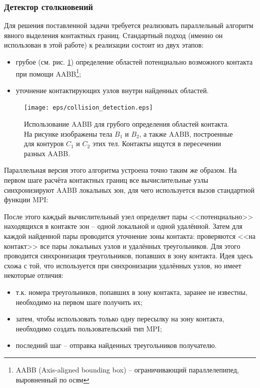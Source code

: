 \subsubsection{Детектор столкновений}
Для решения поставленной задачи требуется реализовать параллельный алгоритм явного выделения контактных границ. Стандартный подход (именно он использован в этой работе) к реализации состоит из двух этапов:
\begin{itemize}
	\item грубое (см. рис. \ref{pic:collision_detection}) определение областей потенциально возможного контакта при помощи AABB\footnote{AABB (Axis-aligned bounding box) -- ограничивающий параллелепипед, выровненный по осям };
	\item уточнение контактирующих узлов внутри найденных областей.
\end{itemize}
\begin{figure}[htp]
\centering
\texttt{[image: eps/collision\_detection.eps]}
\caption{Использование AABB для грубого определения областей контакта. На
рисунке изображены тела $B_1$ и $B_2$, а также AABB, построенные для контуров
$C_1$ и $C_2$ этих тел. Контакты ищутся в пересечении разных AABB.}
\label{pic:collision_detection}
\end{figure}
Параллельная версия этого алгоритма устроена точно таким же образом. На первом шаге расчёта контактных границ все вычислительные узлы синхронизируют AABB локальных зон, для чего используется вызов стандартной функции MPI:

После этого каждый вычислительный узел определяет пары <<потенциально>> находящихся в контакте зон -- одной локальной и одной удалённой. Затем для каждой найденной пары проводится уточнение зоны контакта: проверяются <<на контакт>> все пары локальных узлов и удалённых треугольников. Для этого проводится синхронизация треугольников, попавших в зону контакта. Идея здесь схожа с той, что используется при синхронизации удалённых узлов, но имеет некоторые отличия:
\begin{itemize}
	\item т.к. номера треугольников, попавших в зону контакта, заранее не известны, необходимо на первом шаге получить их;
	\item затем, чтобы использовать только одну пересылку на зону контакта, необходимо создать пользовательский тип MPI;
	\item последний шаг -- отправка найденных треугольников получателю.
\end{itemize}
